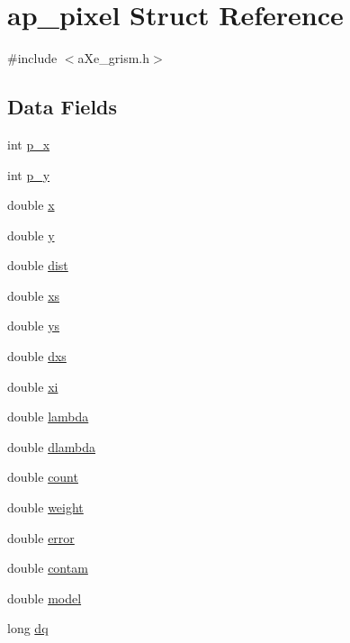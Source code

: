 \hypertarget{structap__pixel}{
\section{ap\_\-pixel Struct Reference}
\label{structap__pixel}
}


{\ttfamily \#include $<$aXe\_\-grism.h$>$}\subsection*{Data Fields}
\begin{DoxyCompactItemize}
\item 
int \hyperlink{structap__pixel_abca28f0936fbd5a569ad548fb25e5a38}{p\_\-x}
\item 
int \hyperlink{structap__pixel_aadf7ee52df3875792fbf13d4d52ed298}{p\_\-y}
\item 
double \hyperlink{structap__pixel_a0ce028c33a28f543bd9255324800e9ea}{x}
\item 
double \hyperlink{structap__pixel_a1df90884734bfaea8ec545b69d802281}{y}
\item 
double \hyperlink{structap__pixel_abd0f197da151fac01c9e4cbd4146f212}{dist}
\item 
double \hyperlink{structap__pixel_aa6a80bf7f2a556b5d846bb3b987450ee}{xs}
\item 
double \hyperlink{structap__pixel_a54b55a4bbb06f7a9065699d976dae956}{ys}
\item 
double \hyperlink{structap__pixel_a92d9e84a233d0a1ad482830b23c5e5ba}{dxs}
\item 
double \hyperlink{structap__pixel_aeae2e14e0f53bd1090acb2a8758104a5}{xi}
\item 
double \hyperlink{structap__pixel_ac36fd281b7d91081490e41ce07a60501}{lambda}
\item 
double \hyperlink{structap__pixel_a8c1c7b5a35a04145fccfc3f84c420cde}{dlambda}
\item 
double \hyperlink{structap__pixel_a846018a7e3b143259419bd74e2d9073f}{count}
\item 
double \hyperlink{structap__pixel_a34600405e114d4bd366c1d33860aff14}{weight}
\item 
double \hyperlink{structap__pixel_a70b0f2e20878570616d81ffac4c15c68}{error}
\item 
double \hyperlink{structap__pixel_a2191ef670b1b5c515fda841dda181f62}{contam}
\item 
double \hyperlink{structap__pixel_ada106f5981b17786de87cfeb2a7db0d1}{model}
\item 
long \hyperlink{structap__pixel_ae86ffac921bd79b2b8e1ee6b2a9b3cd9}{dq}
\end{DoxyCompactItemize}



